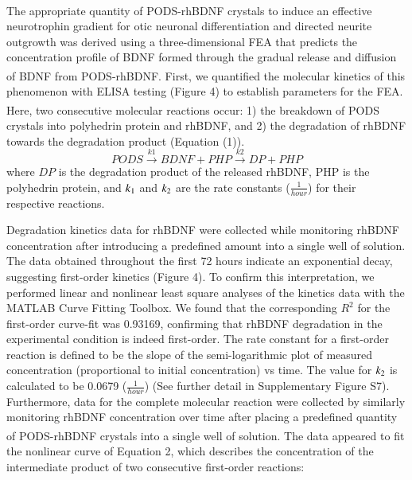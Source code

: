 \documentclass[review]{elsarticle}
\begin{document}
\indent The appropriate quantity of PODS\textsuperscript{\textregistered}-rhBDNF crystals to induce an effective neurotrophin gradient for otic neuronal differentiation and directed neurite outgrowth was derived using a three-dimensional FEA that predicts the concentration profile of BDNF formed through the gradual release and diffusion of BDNF from PODS\textsuperscript{\textregistered}-rhBDNF. First, we quantified the molecular kinetics of this phenomenon with ELISA testing (Figure 4) to establish parameters for the FEA. Here, two consecutive molecular reactions occur: 1) the breakdown of PODS\textsuperscript{\textregistered} crystals into polyhedrin protein and rhBDNF, and 2) the degradation of rhBDNF towards the degradation product (Equation (1)).
\begin{equation}
	PODS\overset{k1}{\longrightarrow}BDNF + PHP\overset{k2}{\longrightarrow}DP + PHP
\end{equation}
where $DP$ is the degradation product of the released rhBDNF, PHP is the polyhedrin protein, and $k\textsubscript{1}$ and $k\textsubscript{2}$ are the rate constants ($\frac{1}{hour}$) for their respective reactions.


Degradation kinetics data for rhBDNF were collected while monitoring rhBDNF concentration after introducing a predefined amount into a single well of solution. The data obtained throughout the first 72 hours indicate an exponential decay, suggesting first-order kinetics (Figure 4). To confirm this interpretation, we performed linear and nonlinear least square analyses of the kinetics data with the MATLAB Curve Fitting Toolbox. We found that the corresponding $R^{2}$ for the first-order curve-fit was 0.93169, confirming that rhBDNF degradation in the experimental condition is indeed first-order. The rate constant for a first-order reaction is defined to be the slope of the semi-logarithmic plot of measured concentration (proportional to initial concentration) vs time. The value for $k\textsubscript{2}$ is calculated to be 0.0679 ($\frac{1}{hour}$) (See further detail in Supplementary Figure S7). Furthermore, data for the complete molecular reaction were collected by similarly monitoring rhBDNF concentration over time after placing a predefined quantity of PODS\textsuperscript{\textregistered}-rhBDNF crystals into a single well of solution. The data appeared to fit the nonlinear curve of Equation 2, which describes the concentration of the intermediate product of two consecutive first-order reactions:  
\end{document}
